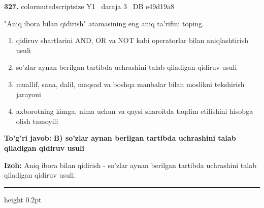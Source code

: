 \documentclass[10pt,a4paper,oneside]{article}
\begin{document}
\noindent\textbf{\color{ink}327.}  {color{muted}scriptsize Y1 \textbullet\ daraja 3 \textbullet\ DB e49d19a8}
\par
"Aniq ibora bilan qidirish" atamasining eng aniq ta'rifini toping.
\begin{enumerate}[label=\Alph*),leftmargin=9mm]
\item qidiruv shartlarini AND, OR va NOT kabi operatorlar bilan aniqlashtirish usuli
\item so'zlar aynan berilgan tartibda uchrashini talab qiladigan qidiruv usuli
\item muallif, sana, dalil, maqsad va boshqa manbalar bilan moslikni tekshirish jarayoni
\item axborotning kimga, nima uchun va qaysi sharoitda taqdim etilishini hisobga olish tamoyili
\end{enumerate}
\begin{tcolorbox}[enhanced,breakable,colback=teal!4,colframe=teal!50!black,boxrule=0.5pt,arc=1.1mm,left=3mm,right=3mm,top=1.7mm,bottom=1.7mm,before skip=2mm,after skip=2mm]
\textbf{\color{teal}To'g'ri javob:} \textbf{B) so'zlar aynan berilgan tartibda uchrashini talab qiladigan qidiruv usuli}
\par\smallskip
\textbf{Izoh:} Aniq ibora bilan qidirish - so'zlar aynan berilgan tartibda uchrashini talab qiladigan qidiruv usuli.
\end{tcolorbox}
\vspace{2mm}\hrule height 0.2pt \vspace{3mm}
\end{document}
